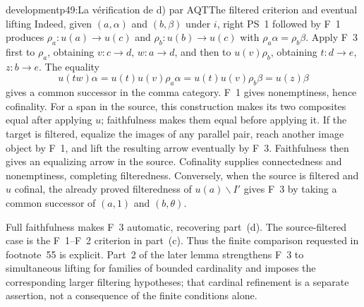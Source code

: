 \begin{dcomment}{development}{p49:La vérification de d) par AQT}{The filtered criterion and eventual lifting}
Indeed, given $(a,\alpha)$ and $(b,\beta)$ under $i$, right PS~1 followed by F~1 produces $\rho_a:u(a)\to u(c)$ and $\rho_b:u(b)\to u(c)$ with $\rho_a\alpha=\rho_b\beta$. Apply F~3 first to $\rho_a$, obtaining $v:c\to d$, $w:a\to d$, and then to $u(v)\rho_b$, obtaining $t:d\to e$, $z:b\to e$. The equality
\[
 u(tw)\alpha=u(t)u(v)\rho_a\alpha
              =u(t)u(v)\rho_b\beta=u(z)\beta
\]
gives a common successor in the comma category. F~1 gives nonemptiness, hence cofinality. For a span in the source, this construction makes its two composites equal after applying $u$; faithfulness makes them equal before applying it. If the target is filtered, equalize the images of any parallel pair, reach another image object by F~1, and lift the resulting arrow eventually by F~3. Faithfulness then gives an equalizing arrow in the source. Cofinality supplies connectedness and nonemptiness, completing filteredness. Conversely, when the source is filtered and $u$ cofinal, the already proved filteredness of $u(a)\backslash I'$ gives F~3 by taking a common successor of $(a,1)$ and $(b,\theta)$.

Full faithfulness makes F~3 automatic, recovering part~(d). The source-filtered case is the F~1--F~2 criterion in part~(c). Thus the finite comparison requested in footnote~55 is explicit. Part~2 of the later lemma strengthens F~3 to simultaneous lifting for families of bounded cardinality and imposes the corresponding larger filtering hypotheses; that cardinal refinement is a separate assertion, not a consequence of the finite conditions alone.
\end{dcomment}

